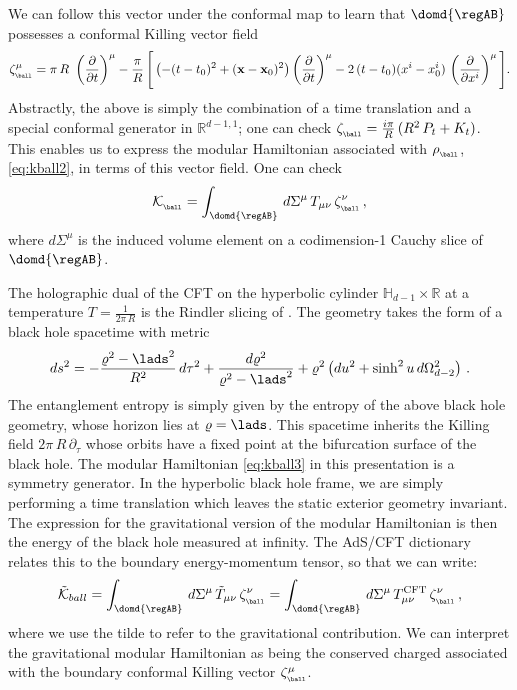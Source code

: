 \documentclass[12pt,openany]{book}
\begin{document}
We can follow this vector under the conformal map to learn that $\domd{\regAB}$ possesses a conformal Killing vector field
%
\begin{equation}
\zeta^\mu_{_{\ball}} = \pi\, R\, \, \left(\frac{\partial}{\partial t}\right)^\mu - \frac{\pi}{R}\, \Bigg[
\left( -(t-t_0)^2 + ({\bf x} - {\bf x}_0)^2\right) \left(\frac{\partial}{\partial t}\right)^\mu -2\, (t-t_0) (x^i -x_0^i) \, \left(\frac{\partial}{\partial x^i}\right)^\mu \Bigg] .
\label{eq:ckvball}
\end{equation}
%
Abstractly, the above is simply the combination of a time translation and a special conformal generator in
${\mathbb R}^{d-1,1}$; one can check $\zeta_{_{\ball}} = \frac{i\pi}{R}\, (R^2 \,P_t + K_t) $. This enables us to express the  modular Hamiltonian associated with $\rho_{_{\ball}}$, \eqref{eq:kball2},  in terms of this vector field. One can check
%
\begin{equation}
{\cal K}_{_{\ball}} = \int_{\domd{\regAB}}\, d\Sigma^\mu\, T_{\mu\nu}\, \zeta_{_{\ball}}^\nu \,,
\label{eq:kball3}
\end{equation}
%
where $d\Sigma^\mu$ is the induced volume element on a codimension-1 Cauchy slice of $\domd{\regAB}$.

The holographic dual of the CFT on the hyperbolic cylinder $\mathbb{H}_{d-1} \times \mathbb{R}$ at a temperature $T = \frac{1}{2\pi\,R}$ is the Rindler slicing of . The geometry takes the form of a black hole spacetime with metric
%
\begin{equation}
ds^2 = -\frac{\varrho^2 - \lads^2}{R^2}\, d\tau^2 + \frac{d\varrho^2}{\varrho^2 - \lads^2}  + \varrho^2 \left(du^2 +\sinh^2u\, d\Omega_{d-2}^2\right)\,.
\label{eq:rads}
\end{equation}
%
The entanglement entropy is simply given by the entropy of the above black hole geometry, whose horizon lies at $\varrho = \lads$. This spacetime inherits the Killing field $2\pi\,R\,\partial_\tau$ whose orbits have a fixed point at the bifurcation surface of the black hole.  The  modular Hamiltonian \eqref{eq:kball3} in this presentation is a symmetry generator. In the hyperbolic black hole frame, we are simply performing a time translation which leaves the static exterior geometry invariant. The expression for the gravitational version of the modular Hamiltonian is then the energy of the black hole measured at infinity. The AdS/CFT dictionary relates this to the boundary energy-momentum tensor, so that we can write:
%
\begin{equation}
{\tilde {\cal K}}_{ball} = \int_{\domd{\regAB}} \,  d\Sigma^\mu\, {\tilde T}_{\mu\nu}\, \zeta_{_{\ball}}^\nu  =
\int_{\domd{\regAB}} \,  d\Sigma^\mu\,T^\text{CFT}_{\mu\nu}\, \zeta_{_{\ball}}^\nu
\,,
\label{}
\end{equation}
%
where we use the tilde to refer to the gravitational contribution. We can interpret the gravitational modular Hamiltonian as being the conserved charged associated with the boundary conformal Killing vector $\zeta_{_{\ball}}^\mu$.
\end{document}
